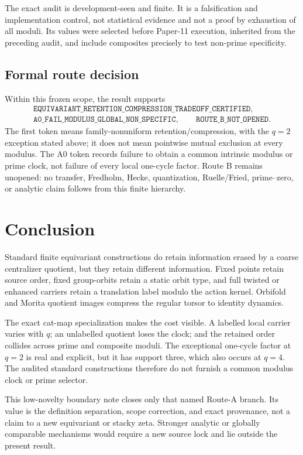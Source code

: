 \documentclass[11pt]{article}
\theoremstyle{definition}
\theoremstyle{remark}
\newcommand{\classification}{\texttt{EQUIVARIANT\_RETENTION\_COMPRESSION\_TRADEOFF\_CERTIFIED}}
\newcommand{\routea}{\texttt{A0\_FAIL\_MODULUS\_GLOBAL\_NON\_SPECIFIC}}
\newcommand{\routeb}{\texttt{ROUTE\_B\_NOT\_OPENED}}
\begin{document}
The exact audit is development-seen and finite.  It is a falsification and
implementation control, not statistical evidence and not a proof by
exhaustion of all moduli.  Its values were selected before Paper-11
execution, inherited from the preceding audit, and include composites
precisely to test non-prime specificity.

\subsection{Formal route decision}

Within this frozen scope, the result supports
\[
\begin{gathered}
  \classification,\\
  \routea,\qquad \routeb.
\end{gathered}
\]
The first token means family-nonuniform retention/compression, with the
\(q=2\) exception stated above; it does not mean pointwise mutual exclusion
at every modulus.  The A0 token records failure to obtain a common intrinsic
modulus or prime clock, not failure of every local one-cycle factor.  Route B
remains unopened: no transfer, Fredholm, Hecke, quantization, Ruelle/Fried,
prime--zero, or analytic claim follows from this finite hierarchy.

\section{Conclusion}
\label{sec:conclusion}

Standard finite equivariant constructions do retain information erased by a
coarse centralizer quotient, but they retain different information.  Fixed
points retain source order, fixed group-orbits retain a static orbit type,
and full twisted or enhanced carriers retain a translation label modulo the
action kernel.  Orbifold and Morita quotient images compress the regular
torsor to identity dynamics.

The exact cat-map specialization makes the cost visible.  A labelled local
carrier varies with \(q\); an unlabelled quotient loses the clock; and the
retained order collides across prime and composite moduli.  The exceptional
one-cycle factor at \(q=2\) is real and explicit, but it has support three,
which also occurs at \(q=4\).  The audited standard constructions therefore
do not furnish a common modulus clock or prime selector.

This low-novelty boundary note closes only that named Route-A branch.  Its
value is the definition separation, scope correction, and exact provenance,
not a claim to a new equivariant or stacky zeta.  Stronger analytic or
globally comparable mechanisms would require a new source lock and lie
outside the present result.
\end{document}
